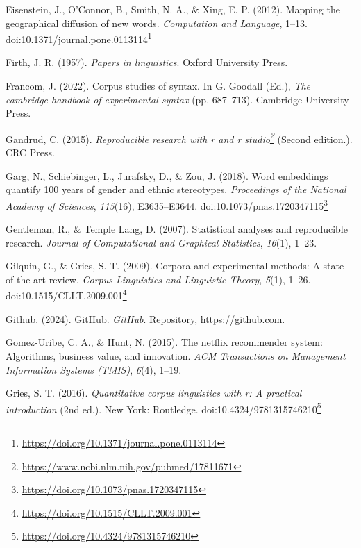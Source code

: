 \documentclass[
  letterpaper,
]{latex/krantz}
\newlength{\cslhangindent}
\newenvironment{CSLReferences}[2] %
 {\begin{list}{}{%
  \setlength{\itemindent}{0pt}
  \setlength{\leftmargin}{0pt}
  \setlength{\parsep}{0pt}
  \ifodd #1
   \setlength{\leftmargin}{\cslhangindent}
   \setlength{\itemindent}{-1\cslhangindent}
  \fi
  \setlength{\itemsep}{#2\baselineskip}}}
 {\end{list}}
\theoremstyle{definition}
\theoremstyle{remark}
\DeclareRobustCommand{\href}[2]{#2\footnote{\url{#1}}}
\begin{document}
\begin{CSLReferences}{1}{0}
Eisenstein, J., O'Connor, B., Smith, N. A., \& Xing, E. P. (2012).
Mapping the geographical diffusion of new words. \emph{Computation and
Language}, 1--13.
doi:\href{https://doi.org/10.1371/journal.pone.0113114}{10.1371/journal.pone.0113114}

Firth, J. R. (1957). \emph{Papers in linguistics}. Oxford University
Press.

Francom, J. (2022). Corpus studies of syntax. In G. Goodall (Ed.),
\emph{The cambridge handbook of experimental syntax} (pp. 687--713).
Cambridge University Press.

Gandrud, C. (2015).
\emph{\href{https://www.ncbi.nlm.nih.gov/pubmed/17811671}{Reproducible
research with r and r studio}} (Second edition.). CRC Press.

Garg, N., Schiebinger, L., Jurafsky, D., \& Zou, J. (2018). Word
embeddings quantify 100 years of gender and ethnic stereotypes.
\emph{Proceedings of the National Academy of Sciences}, \emph{115}(16),
E3635--E3644.
doi:\href{https://doi.org/10.1073/pnas.1720347115}{10.1073/pnas.1720347115}

Gentleman, R., \& Temple Lang, D. (2007). Statistical analyses and
reproducible research. \emph{Journal of Computational and Graphical
Statistics}, \emph{16}(1), 1--23.

Gilquin, G., \& Gries, S. T. (2009). Corpora and experimental methods: A
state-of-the-art review. \emph{Corpus Linguistics and Linguistic
Theory}, \emph{5}(1), 1--26.
doi:\href{https://doi.org/10.1515/CLLT.2009.001}{10.1515/CLLT.2009.001}

Github. (2024). GitHub. \emph{GitHub}. Repository, https://github.com.

Gomez-Uribe, C. A., \& Hunt, N. (2015). The netflix recommender system:
Algorithms, business value, and innovation. \emph{ACM Transactions on
Management Information Systems (TMIS)}, \emph{6}(4), 1--19.

Gries, S. T. (2016). \emph{Quantitative corpus linguistics with r: A
practical introduction} (2nd ed.). New York: Routledge.
doi:\href{https://doi.org/10.4324/9781315746210}{10.4324/9781315746210}


\end{CSLReferences}
\end{document}
